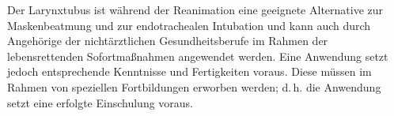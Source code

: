 {Der Larynxtubus{\texttrademark} ist während der Reanimation
eine geeignete Alternative zur Maskenbeatmung und zur
endotrachealen Intubation und kann auch durch Angehörige der
nichtärztlichen Gesundheitsberufe im Rahmen der
lebensrettenden Sofortmaßnahmen angewendet werden.
Eine Anwendung setzt jedoch entsprechende
Kenntnisse und Fertigkeiten voraus. Diese müssen im Rahmen
von speziellen Fortbildungen erworben werden; d.\,h. die
Anwendung setzt eine erfolgte Einschulung voraus.
\cite{BMG-92250_0080-II_A_2010_2010-12-15}
}{}{}{}{}{}








